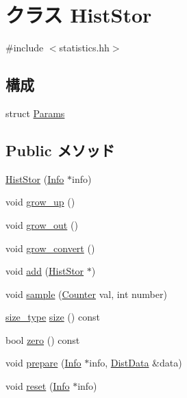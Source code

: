 \hypertarget{classStats_1_1HistStor}{
\section{クラス HistStor}
\label{classStats_1_1HistStor}
}


{\ttfamily \#include $<$statistics.hh$>$}\subsection*{構成}
\begin{DoxyCompactItemize}
\item 
struct \hyperlink{structStats_1_1HistStor_1_1Params}{Params}
\end{DoxyCompactItemize}
\subsection*{Public メソッド}
\begin{DoxyCompactItemize}
\item 
\hyperlink{classStats_1_1HistStor_afc7195eb3d179716c9c440eed73460fb}{HistStor} (\hyperlink{classStats_1_1Info}{Info} $\ast$info)
\item 
void \hyperlink{classStats_1_1HistStor_abe46726abe537958f9a7330be5e6f84c}{grow\_\-up} ()
\item 
void \hyperlink{classStats_1_1HistStor_a415f71fcc1cbf430adbf3fdd2e1a5c63}{grow\_\-out} ()
\item 
void \hyperlink{classStats_1_1HistStor_a35cf15a76de3683b6cbd9243f999e851}{grow\_\-convert} ()
\item 
void \hyperlink{classStats_1_1HistStor_a97c8fa70b9ff6956199f366dfafa678d}{add} (\hyperlink{classStats_1_1HistStor}{HistStor} $\ast$)
\item 
void \hyperlink{classStats_1_1HistStor_a57fea70de4ed8fee9ec9e9d9cca6f9fa}{sample} (\hyperlink{namespaceStats_ac35128c026c72bb36af9cea00774e8a6}{Counter} val, int number)
\item 
\hyperlink{namespaceStats_ada51e68d31936547d3729c82daf6b7c6}{size\_\-type} \hyperlink{classStats_1_1HistStor_a503ab01f6c0142145d3434f6924714e7}{size} () const 
\item 
bool \hyperlink{classStats_1_1HistStor_a4e72b01b727d3165e75cba84eb507491}{zero} () const 
\item 
void \hyperlink{classStats_1_1HistStor_a2e5e3cd36b4a3d6ab774aed4e3fcd641}{prepare} (\hyperlink{classStats_1_1Info}{Info} $\ast$info, \hyperlink{structStats_1_1DistData}{DistData} \&data)
\item 
void \hyperlink{classStats_1_1HistStor_a10d9d71be6e0d2194999bb5dd5280e2d}{reset} (\hyperlink{classStats_1_1Info}{Info} $\ast$info)
\end{DoxyCompactItemize}
